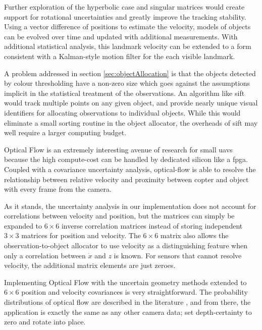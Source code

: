 \documentclass[a4paper, 11pt, titlepage]{article}
\begin{document}
  Further exploration of the hyperbolic case and singular matrices would create support for rotational uncertainties and greatly improve the tracking stability.
  Using a vector difference of positions to estimate the velocity, models of objects can be evolved over time and updated with additional measurements.  With additional statistical analysis, this landmark velocity can be extended to a form consistent with a Kalman-style motion filter for the each visible landmark.

  A problem addressed in section \ref{sec:objectAllocation} is that the objects detected by colour thresholding have a non-zero size which goes against the assumptions implicit in the statistical treatment of the observations.  An algorithm like \gls{sift} would track multiple points on any given object, and provide nearly unique visual identifiers for allocating observations to individual objects.  While this would eliminate a small sorting routine in the object allocator, the overheads of \gls{sift} may well require a larger computing budget.

  Optical Flow is an extremely interesting avenue of research for small \glspl{uav} because the high compute-cost can be handled by dedicated silicon like a \gls{fpga}.  Coupled with a covariance uncertainty analysis, optical-flow is able to resolve the relationship between relative velocity and proximity between copter and object with every frame from the camera.
  
  As it stands, the uncertainty analysis in our implementation does not account for correlations between velocity and position, but the matrices can simply be expanded to \(6\times6\) inverse correlation matrices instead of storing independent \(3\times3\) matrices for position and velocity.  The \(6\times6\) matrix also allows the observation-to-object allocator to use velocity as a distinguishing feature when only a correlation between \(\dot{x}\) and \(z\) is known.  For sensors that cannot resolve velocity, the additional matrix elements are just zeroes.

  Implementing Optical Flow with the uncertain geometry methods extended to \(6\times6\) position and velocity covariances is very straightforward. The probability distributions of optical flow are described in the literature \cite{FlowUncert}, and from there, the application is exactly the same as any other camera data; set depth-certainty to zero and rotate into place. 
\end{document}

